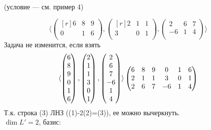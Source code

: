 \begin{prim}
	(условие --- см. пример 4)
\end{prim}
$$\langle 
\begin{pmatrix*}[r]
6 & 8 & 9 \\
0 & 1 & 6 \\
\end{pmatrix*} 
,
\begin{pmatrix*}[r]
2 & 1 & 1 \\
3 & 0 & 1 \\
\end{pmatrix*} 
,
\begin{pmatrix*} %
2 & 6 & 7 \\
-6 & 1 & 4 \\
\end{pmatrix*} 
\rangle $$
Задача не изменится, если взять
$$\langle 
\begin{pmatrix*}[r]
6 \\ 
8 \\ 
9 \\
0 \\ 
1 \\ 
6 \\
\end{pmatrix*} 
,
\begin{pmatrix*}[r]
2 \\ 
1 \\ 
1 \\
3 \\ 
0 \\ 
1 \\
\end{pmatrix*} 
,
\begin{pmatrix*}
2 \\ 
6 \\ 
7 \\
-6 \\ 
1 \\ 
4 \\
\end{pmatrix*} 
\rangle  \\
\begin{pmatrix*}
6 & 8 & 9 & 0 & 1 & 6 \\
2 & 1 & 1 & 3 & 0 & 1 \\
2 & 6 & 7 & -6 & 1 & 4 \\
\end{pmatrix*} 
$$
Т.к. строка (3) ЛНЗ ((1)-2(2)=(3)), ее можно вычеркнуть.\\
$\dim  L'=2$, базис: 
